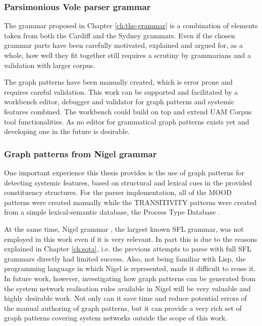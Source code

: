 \subsubsection{Parsimonious Vole parser grammar}
    
    The grammar proposed in Chapter \ref{ch:the-grammar} is a combination of elements taken from both the Cardiff and the Sydney grammars. %
    Even if the chosen grammar parts have been carefully motivated, explained and argued for, as a whole, how well they fit together still requires a scrutiny by grammarians and a validation with larger corpus. 

    
    The graph patterns have been manually created, which is error prone and requires careful validation. This work can be supported and facilitated by a workbench editor, debugger and validator for graph patterns and systemic features combined. The workbench could build on top and extend UAM Corpus tool functionalities. As no editor for grammatical graph patterns exists yet and developing one in the future is desirable.

\subsubsection{Graph patterns from Nigel grammar}

    One important experience this thesis provides is the use of graph patterns for detecting systemic features, based on structural and lexical cues in the provided constituency structures. For the parser implementation, all of the MOOD patterns were created manually while the TRANSITIVITY patterns were created from a simple lexical-semantic database, the Process Type Database \citep{Neale2002}. 
    
    At the same time, Nigel grammar \citep{Matthiessen95-all}, the largest known SFL grammar, was not employed in this work even if it is very relevant. In part this is due to the reasons explained in Chapter \ref{ch:sota}, i.e. the previous attempts to parse with full SFL grammars directly had limited success. Also, not being familiar with Lisp, the programming language in which Nigel is represented, made it difficult to reuse it. In future work, however, investigating how graph patterns can be generated from the system network realisation rules available in Nigel will be very valuable and highly desirable work. Not only can it save time and reduce potential errors of the manual authoring of graph patterns, but it can provide a very rich set of graph patterns covering system networks outside the scope of this work.


